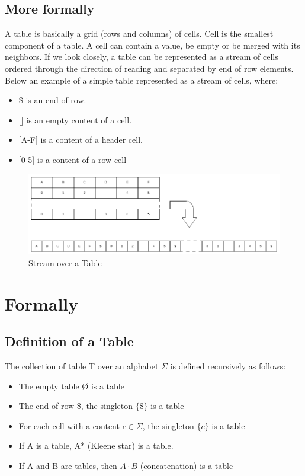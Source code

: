 \documentclass{article}
\begin{document}
\subsection{More formally}
A table is basically a grid (rows and columns) of cells. Cell is the smallest component of a table. A cell can contain a
value, be empty or be merged with its neighbors. If we look closely, a table can be represented as a stream of cells
ordered through the direction of reading and separated by end of row elements. Below an example of a simple table
represented as a stream of cells, where:
\begin{itemize}
    \item{\$} is an end of row.
    \item{[]} is an empty content of a cell.
    \item{[A-F]} is a content of a header cell.
    \item{[0-5]} is a content of a row cell
\end{itemize}
\begin{figure}[H]
\caption{Stream over a Table}
\includegraphics[width=\columnwidth]{table_stream.drawio}
\end{figure}

\section{Formally}

\subsection{Definition of a Table}
The collection of table T over an alphabet $\Sigma$ is defined recursively as follows:
\begin{itemize}
    \item The empty table Ø is a table
    \item The end of row \$, the singleton $\{\$\}$ is a table
    \item For each cell with a content $c \in \Sigma$, the singleton $\{c\}$ is a table
    \item If A is a table, A* (Kleene star) is a table.
    \item If A and B are tables, then $A \cdot B$ (concatenation) is a table
\end{itemize}
\end{document}
